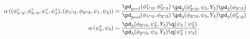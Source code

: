 \begin{align}
  \alpha\left(
    (\phi_{1 \cap 2}^{*}, \phi_{2 \cap 3}^{*}, \psi_{1}^{*}, \psi_{2}^{*}),
    (\phi_{1 \cap 2}, \phi_{2 \cap 3}, \psi_{1}, \psi_{2})
  \right)
  &=
  \frac {
    \pd_{\text{pool}}(\phi_{1 \cap 2}^{*}, \phi_{2 \cap 3}^{*})
  } {
    \pd_{\text{pool}}(\phi_{1 \cap 2}, \phi_{2 \cap 3})
  }
  \frac {
    \pd_{3}(\phi_{2 \cap 3}^{*}, \psi_{3}, Y_{3})
    \pd_{3}(\phi_{2 \cap 3})
  } {
    \pd_{3}(\phi_{2 \cap 3}, \psi_{3}, Y_{3})
    \pd_{3}(\phi_{2 \cap 3}^{*})
  }  \\
  \alpha\left(
    \psi_{3}^{*},
    \psi_{3}
  \right)
  &= 
  \frac {
    \pd_{3}(\phi_{2 \cap 3}, \psi_{3}^{*}, Y_{3})
    \q(\psi_{3} \mid \psi_{3}^{*})
  } {
    \pd_{3}(\phi_{2 \cap 3}, \psi_{3}, Y_{3})
    \q(\psi_{3}^{*} \mid \psi_{3})
  }.
\end{align}